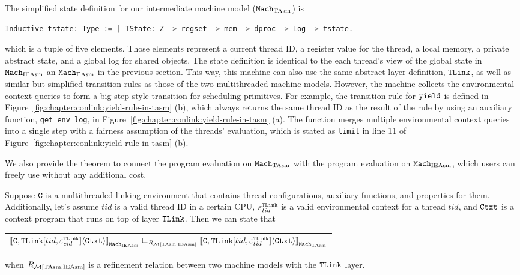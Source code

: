 The simplified state definition for our intermediate machine model (${\mathrm{\texttt{Mach}}}_{\mathrm{TAsm}}$) is
\begin{lstlisting}[language=C]
Inductive tstate: Type := | TState: Z -> regset -> mem -> dproc -> Log -> tstate.
\end{lstlisting}
which is a tuple of five elements. 
Those elements represent a current thread ID, 
a register value for the thread, a local memory, a private abstract state, and a global log for shared objects. 
The state definition is identical to the each thread's view of the global state in ${\mathrm{\texttt{Mach}}}_{\mathrm{IEAsm}}$ an ${\mathrm{\texttt{Mach}}}_{\mathrm{EAsm}}$ in the previous section. 
This way,
this machine can also use the same abstract layer definition, ${{\mathrm{\texttt{TLink}}}}$, 
as well as similar but simplified transition rules as those of the two multithreaded machine models.
However, the machine
 collects the environmental context queries to form a big-step style transition for scheduling primitives. 
 For example, 
 the transition rule for ${\mathrm{\texttt{yield}}}$ is defined in Figure~\ref{fig:chapter:conlink:yield-rule-in-tasm} (b),
 which always returns the same thread ID as the result of the rule 
 by using 
 an auxiliary function, \lstinline$get_env_log$, in  Figure~\ref{fig:chapter:conlink:yield-rule-in-tasm} (a).
 The function   merges multiple environmental context queries into a single step with a fairness assumption
 of the threads' evaluation, which is stated as \lstinline$limit$ in line 11 of  Figure~\ref{fig:chapter:conlink:yield-rule-in-tasm} (b).

We also provide 
the theorem to connect the program evaluation on ${\mathrm{\texttt{Mach}}}_{\mathrm{TAsm}}$
with the program evaluation on ${\mathrm{\texttt{Mach}}}_{\mathrm{IEAsm}}$,
which users can freely use without any additional cost.

\begin{lemma}
\label{lemma:chapter:conlink:ieasm-refines-tasm}
Suppose  ${{\mathrm{\texttt{C}}}}$ is a multithreaded-linking environment that contains thread configurations, auxiliary functions, and properties for them. 
Additionally, let's assume  
 $tid$ is a valid thread ID in a certain CPU, 
 ${\varepsilon}^{{{\mathrm{\texttt{TLink}}}}}_{tid}$ is a valid
environmental context for a thread $tid$, 
and ${\mathrm{\texttt{Ctxt}}}$ is a
 context program that runs on top of layer ${{\mathrm{\texttt{TLink}}}}$.
 Then we can state that
 \begin{center}
\begin{tabular}{c}
${[\![{{{\mathrm{\texttt{C}}}}, {{\mathrm{\texttt{TLink}}}}[tid, {\varepsilon}^{{{\mathrm{\texttt{TLink}}}}}_{cid}]} \langle {{\mathrm{\texttt{Ctxt}}}} \rangle]\!]}_{{\mathrm{\texttt{Mach}}}_{\mathrm{IEAsm}}} \sqsubseteq_{R_{\mathcal{M}{[\mathrm{TAsm}, \mathrm{IEAsm}]}}} {[\![{{{\mathrm{\texttt{C}}}}, {{\mathrm{\texttt{TLink}}}}[tid, {\varepsilon}^{{{\mathrm{\texttt{TLink}}}}}_{tid}]} \langle {{\mathrm{\texttt{Ctxt}}}} \rangle]\!]}_{{\mathrm{\texttt{Mach}}}_{\mathrm{TAsm}}}$\\
\end{tabular}
\end{center}
when $R_{\mathcal{M}{[\mathrm{TAsm}, \mathrm{IEAsm}]}}$ is a refinement relation between two machine models with the  ${{\mathrm{\texttt{TLink}}}}$ layer.
\end{lemma}

